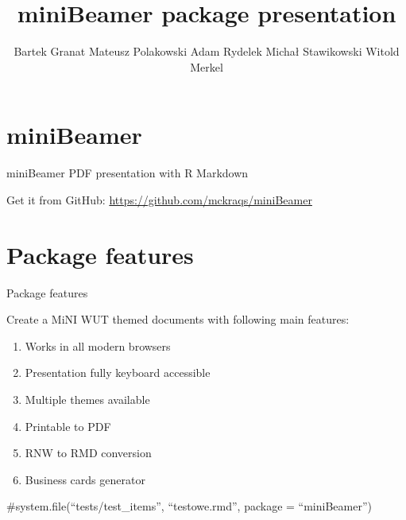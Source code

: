 \documentclass[ignorenonframetext,]{beamer}
\title{miniBeamer package presentation}
\author{Bartek Granat \textbar{} Mateusz Polakowski \textbar{} Adam Rydelek
\textbar{} Michał Stawikowski \textbar{} Witold Merkel}
\date{}
\providecommand{\tightlist}{%
  \setlength{\itemsep}{0pt}\setlength{\parskip}{0pt}}
\begin{document}
\frame{\titlepage}


\section[]{}

\hypertarget{minibeamer}{%
\section{miniBeamer}\label{minibeamer}}

\begin{frame}{miniBeamer PDF presentation with R Markdown}
\protect\hypertarget{minibeamer-pdf-presentation-with-r-markdown}{}

Get it from GitHub: \url{https://github.com/mckraqs/miniBeamer}

\end{frame}

\hypertarget{package-features}{%
\section{Package features}\label{package-features}}

\begin{frame}{Package features}
\protect\hypertarget{package-features-1}{}

Create a MiNI WUT themed documents with following main features:

\begin{enumerate}
\tightlist
\item
  Works in all modern browsers
\item
  Presentation fully keyboard accessible
\item
  Multiple themes available
\item
  Printable to PDF
\item
  RNW to RMD conversion
\item
  Business cards generator
\end{enumerate}

\#system.file(``tests/test\_items'', ``testowe.rmd'', package =
``miniBeamer'')

\end{frame}

\end{document}
